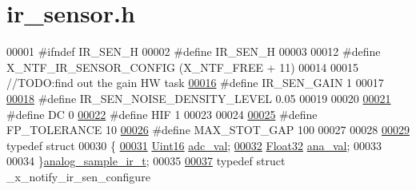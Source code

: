 \hypertarget{a00017_source}{\section{ir\+\_\+sensor.\+h}
\label{a00017_source}
}

\begin{DoxyCode}
00001 \textcolor{preprocessor}{#ifndef IR\_SEN\_H}
00002 \textcolor{preprocessor}{#define IR\_SEN\_H}
00003 
00012 \textcolor{preprocessor}{#define X\_NTF\_IR\_SENSOR\_CONFIG                                  (X\_NTF\_FREE + 11)}
00014 
00015 \textcolor{comment}{//TODO:find out the gain HW task}
\hypertarget{a00017_source_l00016}{}\hyperlink{a00017_af338b9b2d1e427c363ae2dfb091b94b0}{00016} \textcolor{preprocessor}{#define IR\_SEN\_GAIN                                             1}
00017 
\hypertarget{a00017_source_l00018}{}\hyperlink{a00017_a2b2ec7850b6e5f2ba35f81301fc797dd}{00018} \textcolor{preprocessor}{#define IR\_SEN\_NOISE\_DENSITY\_LEVEL                              0.05}
00019 
00020 
\hypertarget{a00017_source_l00021}{}\hyperlink{a00017_a0caba21dab832e280875be65012b30fc}{00021} \textcolor{preprocessor}{#define DC                                                      0}
\hypertarget{a00017_source_l00022}{}\hyperlink{a00017_aaa1c1ffe30eff38b979b1af9d4e4ef19}{00022} \textcolor{preprocessor}{#define HIF                                                     1}
00023 
00024 
\hypertarget{a00017_source_l00025}{}\hyperlink{a00017_a946f0acff4fd16a65859479e9e0b9513}{00025} \textcolor{preprocessor}{#define FP\_TOLERANCE                                            10}
\hypertarget{a00017_source_l00026}{}\hyperlink{a00017_aec8939cfd4ea8a0119ec02a358811b17}{00026} \textcolor{preprocessor}{#define MAX\_STOT\_GAP                                            100}
00027 
00028 
\hypertarget{a00017_source_l00029}{}\hyperlink{a00017}{00029} \textcolor{keyword}{typedef} \textcolor{keyword}{struct}
00030 \{
\hypertarget{a00017_source_l00031}{}\hyperlink{a00017_a891d4fcb12960785cecc1e688681b748}{00031}     \hyperlink{a00072_a59a9f6be4562c327cbfb4f7e8e18f08b}{Uint16}     \hyperlink{a00017_a891d4fcb12960785cecc1e688681b748}{adc\_val};
\hypertarget{a00017_source_l00032}{}\hyperlink{a00017_a053a8ae0e59f7414929cd8ac3feeec7b}{00032}     \hyperlink{a00072_a87d38f886e617ced2698fc55afa07637}{Float32}    \hyperlink{a00017_a053a8ae0e59f7414929cd8ac3feeec7b}{ana\_val};
00033 
00034 \}\hyperlink{a00017_d1/dd6/a00108}{analog\_sample\_ir\_t};
00035 
\hypertarget{a00017_source_l00037}{}\hyperlink{a00017}{00037} \textcolor{keyword}{typedef} \textcolor{keyword}{struct }\_x\_notify\_ir\_sen\_configure

\end{DoxyCode}
